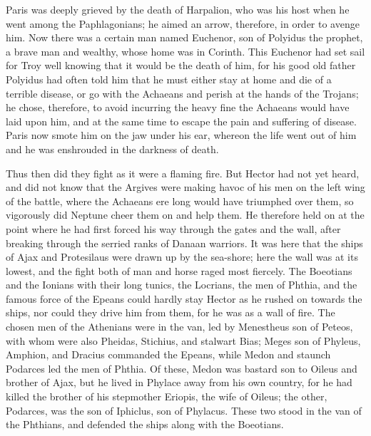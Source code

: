 Paris was deeply grieved by the death of Harpalion, who was his host when
he went among the Paphlagonians; he aimed an arrow, therefore, in order to
avenge him. Now there was a certain man named Euchenor, son of Polyidus
the prophet, a brave man and wealthy, whose home was in Corinth. This
Euchenor had set sail for Troy well knowing that it would be the death of
him, for his good old father Polyidus had often told him that he must
either stay at home and die of a terrible disease, or go with the Achaeans
and perish at the hands of the Trojans; he chose, therefore, to avoid
incurring the heavy fine the Achaeans would have laid upon him, and at the
same time to escape the pain and suffering of disease. Paris now smote him
on the jaw under his ear, whereon the life went out of him and he was
enshrouded in the darkness of death.

Thus then did they fight as it were a flaming fire. But Hector had not yet
heard, and did not know that the Argives were making havoc of his men on
the left wing of the battle, where the Achaeans ere long would have
triumphed over them, so vigorously did Neptune cheer them on and help
them. He therefore held on at the point where he had first forced his way
through the gates and the wall, after breaking through the serried ranks
of Danaan warriors. It was here that the ships of Ajax and Protesilaus
were drawn up by the sea-shore; here the wall was at its lowest, and the
fight both of man and horse raged most fiercely. The Boeotians and the
Ionians with their long tunics, the Locrians, the men of Phthia, and the
famous force of the Epeans could hardly stay Hector as he rushed on
towards the ships, nor could they drive him from them, for he was as a
wall of fire. The chosen men of the Athenians were in the van, led by
Menestheus son of Peteos, with whom were also Pheidas, Stichius, and
stalwart Bias; Meges son of Phyleus, Amphion, and Dracius commanded the
Epeans, while Medon and staunch Podarces led the men of Phthia. Of these,
Medon was bastard son to Oileus and brother of Ajax, but he lived in
Phylace away from his own country, for he had killed the brother of his
stepmother Eriopis, the wife of Oileus; the other, Podarces, was the son
of Iphiclus, son of Phylacus. These two stood in the van of the Phthians,
and defended the ships along with the Boeotians.

